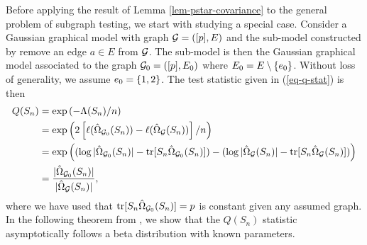 Before applying the result of Lemma \ref{lem-pstar-covariance} to the general problem of subgraph testing, we start with studying a special case. Consider a Gaussian graphical model with graph ${\mathcal{G}} = ([p], E)$ and the sub-model constructed by remove an edge $a \in E$ from ${\mathcal{G}}$. The sub-model is then the Gaussian graphical model associated to the graph ${\mathcal{G}}_0 = ([p], E_0)$ where $E_0 = E \setminus {\left\{e_0\right\}}$. Without loss of generality, we assume $e_0 = {\left\{1,2\right\}}$. The test statistic given in (\ref{eq-q-stat}) is then
\begin{align*}
    Q(S_n) 
    &= \exp\left(-\Lambda(S_n) / n\right)  \\
    &= \exp\left(2 \left[\ell(\hat\Omega_{{\mathcal{G}}_0}(S_n)) - \ell(\hat\Omega_{\mathcal{G}}(S_n))\right] / n\right) \\
    &= \exp\left(
        (\log |\hat\Omega_{{\mathcal{G}}_0}(S_n)| - {\textrm{tr}}[S_n\hat\Omega_{{\mathcal{G}}_0}(S_n)])
        -    
        (\log |\hat\Omega_{\mathcal{G}}(S_n)| - {\textrm{tr}}[S_n\hat\Omega_{\mathcal{G}}(S_n)])\right) \\
    &= \frac{|\hat\Omega_{{\mathcal{G}}_0}(S_n)|}{|\hat\Omega_{{\mathcal{G}}}(S_n)|},
\end{align*}
where we have used that ${\textrm{tr}}[S_n\hat\Omega_{{\mathcal{G}}_0}(S_n)] = p$ is constant given any assumed graph. In the following theorem from \cite[Theorem 3.2]{eriksen1996tests}, we show that the $Q(S_n)$ statistic asymptotically follows a beta distribution with known parameters.

